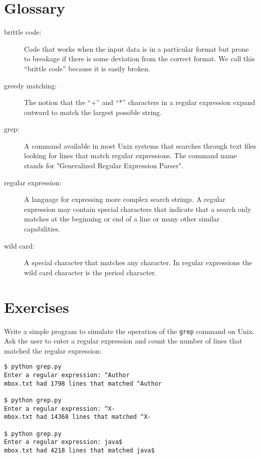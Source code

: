 \section{Glossary}

\begin{description}

\item[brittle code:]
Code that works when the input data is in a particular format but prone to breakage
if there is some deviation from the correct format.  We call this ``brittle code'' 
because it is easily broken.

\item[greedy matching:]
The notion that the ``+'' and ``*'' characters in a regular expression expand outward to match the largest possible string.

\item[grep:]
A command available in most Unix systems that searches through text files looking for lines that match regular expressions.  The command name stands for "Generalized Regular Expression Parser".

\item[regular expression:]
A language for expressing more complex search strings.  A regular expression may contain special characters that indicate that a search only matches at the beginning or end of a line or many other similar capabilities.

\item[wild card:]
A special character that matches any character.   In regular expressions the wild card character is the period character.

\end{description}

\section{Exercises}

\begin{ex}
Write a simple program to simulate the operation of the {\tt grep} command 
on Unix.  Ask the user to enter a regular expression and count the number
of lines that matched the regular expression:

\beforeverb
\begin{verbatim}
$ python grep.py
Enter a regular expression: ^Author
mbox.txt had 1798 lines that matched ^Author

$ python grep.py
Enter a regular expression: ^X-
mbox.txt had 14368 lines that matched ^X-

$ python grep.py
Enter a regular expression: java$
mbox.txt had 4218 lines that matched java$
\end{verbatim}
\afterverb
%
\end{ex}


